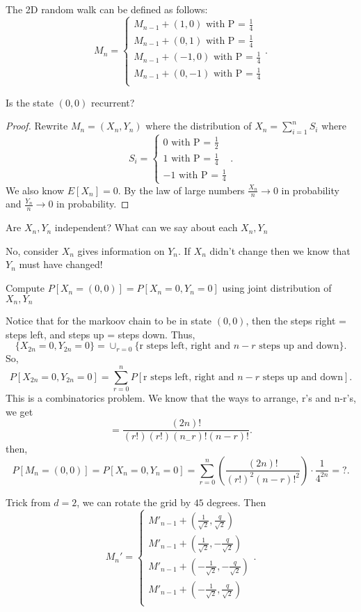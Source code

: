 \documentclass[a4paper]{article}
\begin{document}
The 2D random walk can be defined as follows:
\[
M_n = \begin{cases}
  M_{n-1} + (1,0) \text{ with P = $\frac{1}{4}$} \\
  M_{n-1} + (0,1) \text{ with P = $\frac{1}{4}$} \\
  M_{n-1} + (-1,0) \text{ with P = $\frac{1}{4}$} \\
  M_{n-1} + (0,-1) \text{ with P = $\frac{1}{4}$} \\
\end{cases}
.\] 
\begin{note}
  Is the state $(0,0)$ recurrent?
\end{note}
\begin{proof}
  Rewrite $M_n = (X_n, Y_n)$ where the distribution of  $X_n = \sum_{i=1}^{n} S_i$ where 
   \[
  S_i = \begin{cases}
    0 \text{ with P = $\frac{1}{2}$} \\
    1 \text{ with P = $\frac{1}{4}$} \\
    -1 \text{ with P = $\frac{1}{4}$} 
  \end{cases}
  .\] 
  We also know $E[X_n] = 0$. By the law of large numbers  $\frac{X_n}{n } \to 0$ in probability and $\frac{Y_n}{n} \to 0$ in probability.
\end{proof}

\begin{note}
  Are $X_n,Y_n$ independent? What can we say about each $X_n,Y_n$
\end{note}
No, consider $X_n$ gives information on  $Y_n$. If $X_n$ didn't change then we know that  $Y_n$ must have changed!

\begin{note}
  Compute $P[X_n = (0,0)] = P[X_n =0 , Y_n = 0]$ using joint distribution of $X_n, Y_n$ 
\end{note}
Notice that for the markoov chain to be in state $(0,0)$, then the steps right = steps left, and steps up = steps down. Thus,
 \[
\{X_{2n} = 0, Y_{2n} = 0\} = \cup_{r = 0} \{\text{r steps left, right and $n-r$ steps up and down} \}  
.\] 
So,
\[
  P[X_{2n} =0, Y_{2n} = 0] = \sum_{r=0}^{n} P[\text{r steps left, right and $n-r$ steps up and down}]
.\] 
This is a combinatorics problem. We know that the ways to arrange, r's and n-r's, we get
\[
= \frac{(2n)!}{(r!)(r!) (n_-r)!(n-r)!}
.\] 
then,
\[
  P[M_{n} = (0,0)] = P[X_n=0, Y_n=0] = \sum_{r=0}^{n} \left( \frac{(2n)!}{(r!)^{2} (n-r)!^{2}} \right) \cdot \frac{1}{4^{2n}}  = ? 
.\]

Trick from $d=2$, we can rotate the grid by  $45$ degrees. Then
 \[
M_n' = \begin{cases}
  M'_{n-1} + (\frac{1}{\sqrt{2} }, \frac{q}{\sqrt{2} }) \\
  M'_{n-1} + (\frac{1}{\sqrt{2} }, -\frac{q}{\sqrt{2} }) \\
  M'_{n-1} + (-\frac{1}{\sqrt{2} }, -\frac{q}{\sqrt{2} }) \\
  M'_{n-1} + (-\frac{1}{\sqrt{2} }, \frac{q}{\sqrt{2} }) \\
\end{cases}
.\] 
\end{document}
